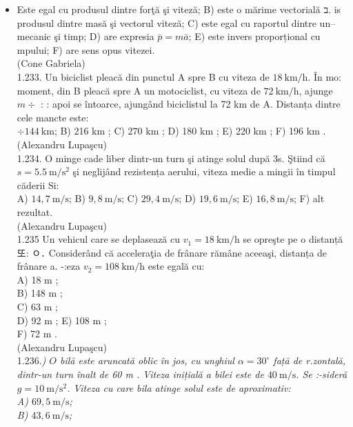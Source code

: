 {\begin{itemize}
  \item Este egal cu produsul dintre forţă şi viteză; B) este o mărime vectorială ב. is produsul dintre masă şi vectorul viteză; C) este egal cu raportul dintre un-- mecanic şi timp; D) are expresia $\bar{p}=m \bar{a}$; E) este invers proporțional cu mpului; F) are sens opus vitezei.\\
(Cone Gabriela)\\
1.233. Un biciclist pleacă din punctul A spre B cu viteza de $18 \mathrm{~km} / \mathrm{h}$. În mo: moment, din B pleacă spre A un motociclist, cu viteza de $72 \mathrm{~km} / \mathrm{h}$, ajunge $m \div$ : : apoi se întoarce, ajungând biciclistul la 72 km de A. Distanța dintre cele mancte este:\\
$\div 144 \mathrm{~km}$; B) 216 km ; C) 270 km ; D) 180 km ; E) 220 km ; F) 196 km .\\
(Alexandru Lupaşcu)\\
1.234. O minge cade liber dintr-un turn şi atinge solul după 3s. Ştiind că $s=5.5 \mathrm{~m} / \mathrm{s}^{2}$ şi neglijând rezistența aerului, viteza medie a mingii în timpul căderii Si:\\
A) $14,7 \mathrm{~m} / \mathrm{s}$; B) $9,8 \mathrm{~m} / \mathrm{s}$; C) $29,4 \mathrm{~m} / \mathrm{s}$; D) $19,6 \mathrm{~m} / \mathrm{s}$; E) $16,8 \mathrm{~m} / \mathrm{s}$; F) alt rezultat.\\
(Alexandru Lupaşcu)\\
1.235 Un vehicul care se deplasează cu $v_{1}=18 \mathrm{~km} / \mathrm{h}$ se opreşte pe o distanță 또: ㅇ․ Considerând că acceleraţia de frânare rămâne aceeaşi, distanța de frânare a. -:eza $v_{2}=108 \mathrm{~km} / \mathrm{h}$ este egală cu:\\
A) 18 m ;\\
B) 148 m ;\\
C) 63 m ;\\
D) 92 m ; E) 108 m ;\\
F) 72 m .\\
(Alexandru Lupaşcu)\\
1.236.\textit{) $O$ bilă este aruncată oblic în jos, cu unghiul $\alpha=30^{\circ}$ față de r.zontală, dintr-un turn înalt de 60 m . Viteza inițială a bilei este de $40 \mathrm{~m} / \mathrm{s}$. Se :-sideră $g=10 \mathrm{~m} / \mathrm{s}^{2}$. Viteza cu care bila atinge solul este de aproximativ:\\
A) $69,5 \mathrm{~m} / \mathrm{s}$;\\
B) $43,6 \mathrm{~m} / \mathrm{s}$;\\
}
\end{itemize}}
